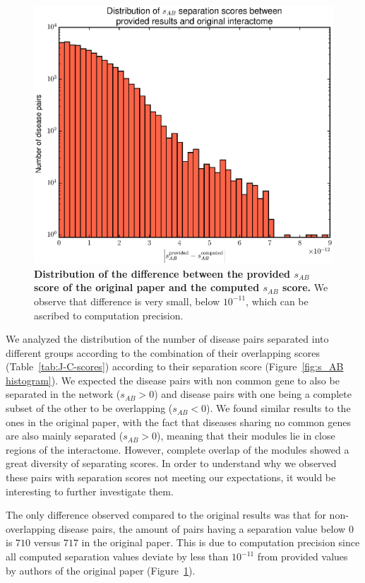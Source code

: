\documentclass[letterpaper]{article}
\begin{document}
		\begin{figure}[!h]
		\hspace{-.55cm}
		\includegraphics[width=.55\textwidth]{images/sep_difference_histogram.eps}
		\vspace{-.5cm}
		\caption{{\bf Distribution of the difference between the provided $s_{AB}$ score of the original
		paper and the computed $s_{AB}$ score.} We observe that difference is very small, below $10^{-11}$, which can be ascribed
		to computation precision.
		\label{fig:s_AB difference}}
		\vspace{-0.7cm}
		\end{figure}

		We analyzed the distribution of the number of disease pairs separated into different groups according
		to the combination of their overlapping scores (Table~\ref{tab:J-C-scores}) according to their
		separation score (Figure~\ref{fig:s_AB histogram}). We expected the disease pairs with non common gene to also be
		separated in the network ($s_{AB} > 0$) and disease pairs with one being a complete subset of the other to be
		overlapping ($s_{AB} < 0$). We found similar results to the ones in the original paper, with the fact
		that diseases sharing no common genes are also mainly separated ($s_{AB} > 0$), meaning that their modules
		lie in close regions of the interactome.
		However, complete overlap of the modules showed a great diversity of separating scores. In order to understand
		why we observed these pairs with separation scores not meeting our expectations, it would be interesting to
		further investigate them.

		The only difference observed compared to the original results was that for non-overlapping
		disease pairs, the amount of pairs having a separation value below 0 is $710$ versus $717$ in the
		original paper. This is due to computation precision since all computed separation values deviate
		by less than $10^{-11}$ from provided values by authors of the original paper
		(Figure~\ref{fig:s_AB difference}).
\end{document}
